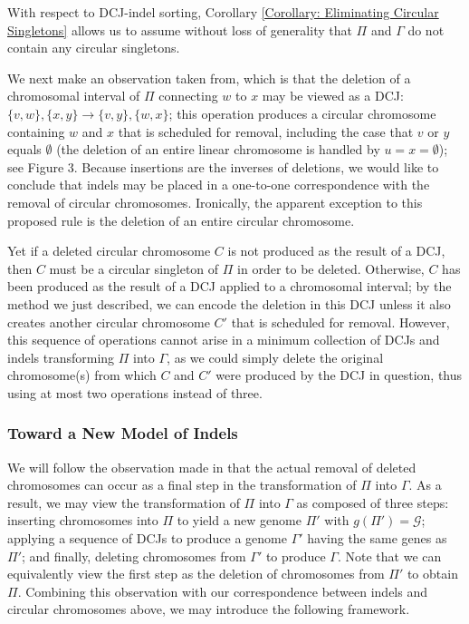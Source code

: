 \noindent With respect to DCJ-indel sorting, Corollary \ref{Corollary: Eliminating Circular Singletons} allows us to assume without loss of generality that $\Pi$ and $\Gamma$ do not contain any circular singletons.

We next make an observation taken from\cite{ma}, which is that the deletion of a chromosomal interval of $\Pi$ connecting $w$ to $x$ may be viewed as a DCJ: $\{v, w\}, \{x, y\} \rightarrow \{v, y\}, \{w, x\}$; this operation produces a circular chromosome containing $w$ and $x$ that is scheduled for removal, including the case that $v$ or $y$ equals $\emptyset$ (the deletion of an entire linear chromosome is handled by $u = x = \emptyset$); see Figure 3.  Because insertions are the inverses of deletions, we would like to conclude that indels may be placed in a one-to-one correspondence with the removal of circular chromosomes. Ironically, the apparent exception to this proposed rule is the deletion of an entire circular chromosome.

Yet if a deleted circular chromosome $C$ is not produced as the result of a DCJ, then $C$ must be a circular singleton of $\Pi$ in order to be deleted. Otherwise, $C$ has been produced as the result of a DCJ applied to a chromosomal interval; by the method we just described, we can encode the deletion in this DCJ unless it also creates another circular chromosome $C'$ that is scheduled for removal.  However, this sequence of operations cannot arise in a minimum collection of DCJs and indels transforming $\Pi$ into $\Gamma$, as we could simply delete the original chromosome(s) from which $C$ and $C'$ were produced by the DCJ in question, thus using at most two operations instead of three.

\subsubsection*{Toward a New Model of Indels}

We will follow the observation made in\cite{ma} that the actual removal of deleted chromosomes can occur as a final step in the transformation of $\Pi$ into $\Gamma$.  As a result, we may view the transformation of $\Pi$ into $\Gamma$ as composed of three steps: inserting chromosomes into $\Pi$ to yield a new genome $\Pi'$ with $g(\Pi') = \mathcal{G}$; applying a sequence of DCJs to produce a genome $\Gamma'$ having the same genes as $\Pi'$; and finally, deleting chromosomes from $\Gamma'$ to produce $\Gamma$.  Note that we can equivalently view the first step as the deletion of chromosomes from $\Pi'$ to obtain $\Pi$.  Combining this observation with our correspondence between indels and circular chromosomes above, we may introduce the following framework.

